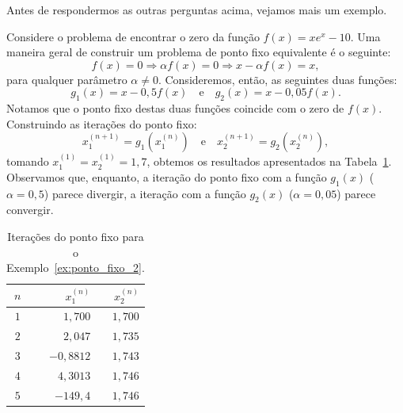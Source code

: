 
Antes de respondermos as outras perguntas acima, vejamos mais um exemplo.

\begin{ex}\label{ex:ponto_fixo_2}
  Considere o problema de encontrar o zero da função $f(x) = xe^x - 10$. Uma maneira geral de construir um problema de ponto fixo equivalente é o seguinte:
  \begin{equation}
    f(x) = 0 \Rightarrow \alpha f(x) = 0 \Rightarrow x - \alpha f(x) = x,
  \end{equation}
para qualquer parâmetro $\alpha\neq 0$. Consideremos, então, as seguintes duas funções:
\begin{equation}
  g_1(x) = x - 0,5f(x)\quad\text{e}\quad g_2(x) = x - 0,05f(x).
\end{equation}
Notamos que o ponto fixo destas duas funções coincide com o zero de $f(x)$. Construindo as iterações do ponto fixo:
\begin{equation}
  x_1^{(n+1)} = g_1(x_1^{(n)})\quad\text{e}\quad x_2^{(n+1)} = g_2(x_2^{(n)}),
\end{equation}
tomando $x_1^{(1)} = x_2^{(1)} = 1,7$, obtemos os resultados apresentados na Tabela~\ref{tab:ponto_fixo_2}. Observamos que, enquanto, a iteração do ponto fixo com a função $g_1(x)$ ($\alpha = 0,5$) parece divergir, a iteração com a função $g_2(x)$ ($\alpha = 0,05$) parece convergir.

\begin{table}
  \centering
  \caption{Iterações do ponto fixo para o Exemplo~\ref{ex:ponto_fixo_2}.}\label{tab:ponto_fixo_2}
  \begin{tabular}{c|rr}\hline
    $n$ & $x_1^{(n)}$ & $x_2^{(n)}$ \\\hline
    $1$ & $1,700$ & $1,700$\\
    $2$ & $2,047$ & $1,735$\\
    $3$ & $-0,8812$ & $1,743$ \\
    $4$ & $4,3013$ & $1,746$\\
    $5$ & $-149,4$ & $1,746$\\\hline
  \end{tabular}
\end{table}


\end{ex}
